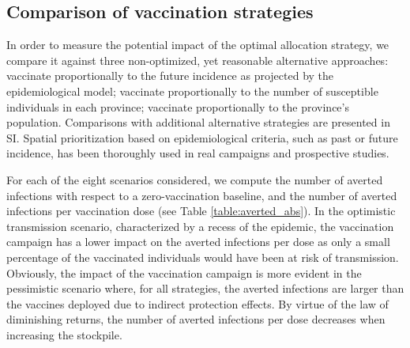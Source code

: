 \subsection*{Comparison of vaccination strategies}
In order to measure the potential impact of the optimal allocation strategy, we compare it against three non-optimized, yet reasonable alternative approaches: vaccinate proportionally to the future incidence as projected by the epidemiological model; vaccinate proportionally to the number of susceptible individuals in each province; vaccinate proportionally to the province's population. 
Comparisons with additional alternative strategies are presented in SI. Spatial prioritization based on epidemiological criteria, such as past\cite{Lee:AchievingCoordinatedNational:2020} or future\cite{Pasetto:RealtimeForecastingCholera:2018} incidence, has been thoroughly used in real campaigns and prospective studies.

For each of the eight scenarios considered, we compute the number of averted infections with respect to a zero-vaccination baseline, and the number of averted infections per vaccination dose (see Table \ref{table:averted_abs}). In the optimistic transmission scenario, characterized by a recess of the epidemic, the vaccination campaign has a lower impact on the averted infections per dose as only a small percentage of the vaccinated individuals would have been at risk of transmission. Obviously, the impact of the vaccination campaign is more evident in the pessimistic scenario where, for all strategies, the averted infections are larger than the vaccines deployed due to indirect protection effects. By virtue of the law of diminishing returns, the number of averted infections per dose decreases when increasing the stockpile. 

